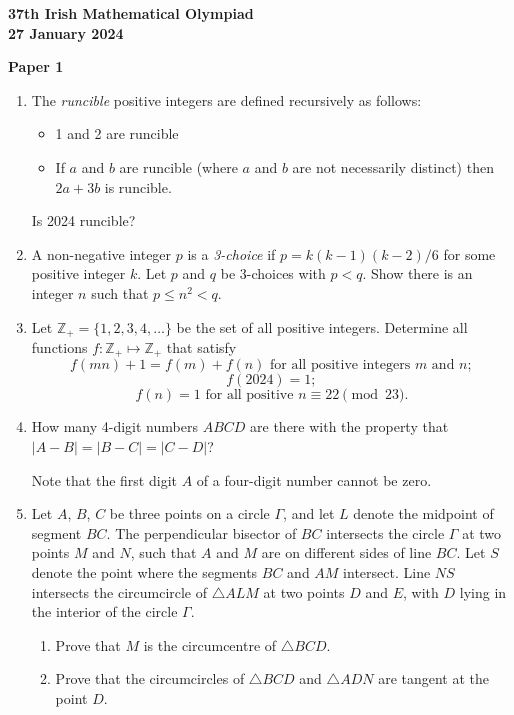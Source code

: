 \documentclass[12pt]{article}
\begin{document}
\begin{center}
{\large\bfseries 37th Irish Mathematical Olympiad\\27 January 2024}
\end{center}
\bigskip\noindent\textbf{Paper 1}\bigskip
\begin{enumerate}
\item The \textit{runcible} positive integers are defined recursively as follows:
\begin{itemize}
\item 1 and 2 are runcible
\item If $a$ and $b$ are runcible (where $a$ and $b$ are not necessarily distinct) then $2a + 3b$ is runcible.
\end{itemize}
Is 2024 runcible?

\item A non-negative integer $p$ is a \textit{3-choice} if $p = k(k-1)(k-2)/6$ for some positive integer $k$. Let $p$ and $q$ be 3-choices with $p < q$. Show there is an integer $n$ such that $p \le n^2 < q$.

\item Let $\mathbb{Z}_+ = \{1, 2, 3, 4, \ldots\}$ be the set of all positive integers. Determine all functions $f : \mathbb{Z}_+ \mapsto \mathbb{Z}_+$ that satisfy
\[
f(mn) + 1 = f(m) + f(n) \text{ for all positive integers } m \text{ and } n;
\]
\[
f(2024) = 1;
\]
\[
f(n) = 1 \text{ for all positive } n \equiv 22 \pmod{23}.
\]

\item How many 4-digit numbers $ABCD$ are there with the property that $|A - B| = |B - C| = |C - D|$?

Note that the first digit $A$ of a four-digit number cannot be zero.

\item Let $A$, $B$, $C$ be three points on a circle $\Gamma$, and let $L$ denote the midpoint of segment $BC$. The perpendicular bisector of $BC$ intersects the circle $\Gamma$ at two points $M$ and $N$, such that $A$ and $M$ are on different sides of line $BC$. Let $S$ denote the point where the segments $BC$ and $AM$ intersect. Line $NS$ intersects the circumcircle of $\triangle ALM$ at two points $D$ and $E$, with $D$ lying in the interior of the circle $\Gamma$.
\begin{enumerate}
\item[(a)] Prove that $M$ is the circumcentre of $\triangle BCD$.
\item[(b)] Prove that the circumcircles of $\triangle BCD$ and $\triangle ADN$ are tangent at the point $D$.
\end{enumerate}
\end{enumerate}
\end{document}
